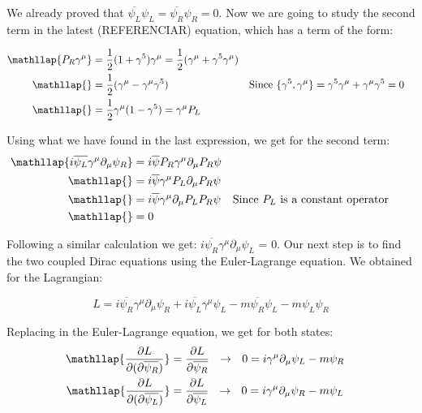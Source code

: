 We already proved that $\overline{\psi_L}\psi_L = \overline{\psi_R}\psi_R = 0$. Now we are going to study the second term in the latest (REFERENCIAR) equation, which has a term of the form:

\begin{align}
  &\begin{aligned}
     \mathllap{P_R\gamma^\mu}  &= \frac{1}{2} (1 + \gamma^5)\gamma^\mu = \frac{1}{2} (\gamma^\mu + \gamma^5 \gamma^\mu) \\        
     \mathllap{}            &= \frac{1}{2} (\gamma^\mu - \gamma^\mu \gamma^5) & \text{Since $\{\gamma^5,\gamma^\mu\} = \gamma^5\gamma^\mu + \gamma^\mu \gamma^5 = 0$} \\
     \mathllap{}            &= \frac{1}{2} \gamma^\mu (1 - \gamma^5) = \gamma^\mu P_L 
  &\end{aligned}
\end{align}

Using what we have found in the last expression, we get for the second term:
\begin{align}
  &\begin{aligned}
     \mathllap{i\overline{\psi_L}\gamma^\mu \partial_\mu \psi_R}  &=  i \overline{\psi}P_R \gamma^\mu \partial_\mu P_R \psi\\        
     \mathllap{}            &=  i \overline{\psi}\gamma^\mu P_L \partial_\mu P_R\psi \\
     \mathllap{}            &=  i \overline{\psi}\gamma^\mu \partial_\mu P_L P_R \psi && \text{Since $P_L$ is a constant operator}\\
     \mathllap{}            &=  0
  &\end{aligned}
\end{align}

Following a similar calculation we get: $i\overline{\psi_R}\gamma^\mu \partial_\mu \psi_L$ = 0. Our next step is to find the two coupled Dirac equations using the Euler-Lagrange equation. We 
obtained for the Lagrangian:   

\begin{equation}
L = i \overline{\psi_R} \gamma^\mu \partial_\mu \psi_R + i \overline{\psi_L}\gamma^\mu \psi_L -m\overline{\psi_R}\psi_L - m \psi_L\psi_R
\end{equation}

Replacing in the Euler-Lagrange equation, we get for both states:
\begin{align}
  &\begin{aligned}\label{major start}
     \mathllap{\frac{\partial L}{\partial(\partial \overline{\psi_R})}}  &=  \frac{\partial L}{\partial \overline{\psi_R}} \ \ \rightarrow \ \ 0 = i \gamma^\mu \partial_\mu \psi_L -m \psi_R  \\        
     \mathllap{\frac{\partial L}{\partial(\partial \overline{\psi_L})}}  &=  \frac{\partial L}{\partial \overline{\psi_L}} \ \ \rightarrow \ \ 0 = i \gamma^\mu \partial_\mu \psi_R -m \psi_L\\ 
  &\end{aligned} 
\end{align}

